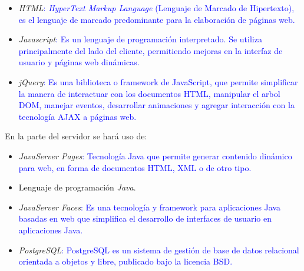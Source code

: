 \documentclass[11pt,letterpaper,titlepage]{article}
\begin{document}
\begin{itemize}
 \item \textit{HTML}\textcolor{blue}{: \textit{HyperText Markup Language} (Lenguaje de Marcado de Hipertexto), es el lenguaje de marcado predominante para la elaboraci\'on de p\'aginas web.}
 \item \textit{Javascript}\textcolor{blue}{: Es un lenguaje de programaci\'on interpretado. Se utiliza principalmente del lado del cliente, permitiendo mejoras en la interfaz de usuario y p\'aginas web din\'amicas.}
 \item \textit{jQuery}\textcolor{blue}{: Es una biblioteca o framework de JavaScript, que permite simplificar la manera de interactuar con los documentos HTML, manipular el arbol DOM, manejar eventos, desarrollar animaciones y agregar interacci\'on con la tecnolog\'ia AJAX a p\'aginas web.}
\end{itemize}
En la parte del servidor se har\'a uso de:
\begin{itemize}
 \item \textit{JavaServer Pages}\textcolor{blue}{: Tecnolog\'ia Java que permite generar contenido din\'amico para web, en forma de documentos HTML, XML o de otro tipo.\cite{jsp}}

 \item Lenguaje de programaci\'on \textit{Java}.
\item \textit{JavaServer Faces}\textcolor{blue}{: Es una tecnolog\'ia y framework para aplicaciones Java basadas en web que simplifica el desarrollo de interfaces de usuario en aplicaciones Java.\cite{jsf}}
 \item \textit{PostgreSQL}\textcolor{blue}{: PostgreSQL es un sistema de gesti\'on de base de datos relacional orientada a objetos y libre, publicado bajo la licencia BSD.\cite{postgre}}
\end{itemize}
\end{document}
